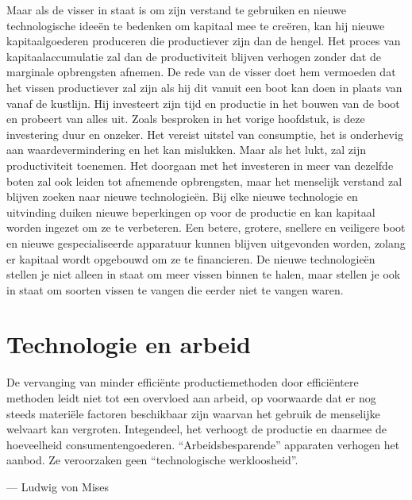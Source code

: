 Maar als de visser in staat is om zijn verstand te gebruiken en nieuwe technologische ideeën te bedenken om kapitaal mee te creëren, kan hij nieuwe kapitaalgoederen produceren die productiever zijn dan de hengel. Het proces van kapitaalaccumulatie zal dan de productiviteit blijven verhogen zonder dat de marginale opbrengsten afnemen. De rede van de visser doet hem vermoeden dat het vissen productiever zal zijn als hij dit vanuit een boot kan doen in plaats van vanaf de kustlijn. Hij investeert zijn tijd en productie in het bouwen van de boot en probeert van alles uit. Zoals besproken in het vorige hoofdstuk, is deze investering duur en onzeker. Het vereist uitstel van consumptie, het is onderhevig aan waardevermindering en het kan mislukken. Maar als het lukt, zal zijn productiviteit toenemen. Het doorgaan met het investeren in meer van dezelfde boten zal ook leiden tot afnemende opbrengsten, maar het menselijk verstand zal blijven zoeken naar nieuwe technologieën. Bij elke nieuwe technologie en uitvinding duiken nieuwe beperkingen op voor de productie en kan kapitaal worden ingezet om ze te verbeteren. Een betere, grotere, snellere en veiligere boot en nieuwe gespecialiseerde apparatuur kunnen blijven uitgevonden worden, zolang er kapitaal wordt opgebouwd om ze te financieren. De nieuwe technologieën stellen je niet alleen in staat om meer vissen binnen te halen, maar stellen je ook in staat om soorten vissen te vangen die eerder niet te vangen waren.


\hypertarget{technologie-en-arbeid}{%
\section{Technologie en arbeid}\label{technologie-en-arbeid}}

\begin{blockquotebox}
    De vervanging van minder efficiënte productiemethoden door efficiëntere methoden leidt niet tot een overvloed aan arbeid, op voorwaarde dat er nog steeds materiële factoren beschikbaar zijn waarvan het gebruik de menselijke welvaart kan vergroten. Integendeel, het verhoogt de productie en daarmee de hoeveelheid consumentengoederen. ``Arbeidsbesparende'' apparaten verhogen het aanbod. Ze veroorzaken geen ``technologische werkloosheid''.\footnotemark
    \par\raggedleft--- Ludwig von Mises
\end{blockquotebox} 

